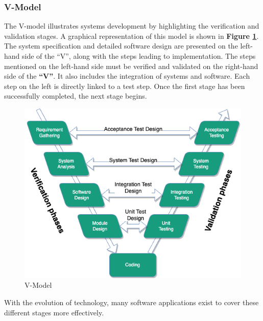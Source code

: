     
\subsubsection{V-Model}
The V-model illustrates systems development by highlighting the verification and validation stages. A graphical representation of this model is shown in \textbf{Figure \ref{fig:v-model}}. The system specification and detailed software design are presented on the left-hand side of the “V”, along with the steps leading to implementation. The steps mentioned on the left-hand side must be verified and validated on the right-hand side of the \textbf{“V”}. It also includes the integration of systems and software. Each step on the left is directly linked to a test step. Once the first stage has been successfully completed, the next stage begins.\\

\begin{figure}[H]
    \centering
    \includegraphics[scale=0.6]{images/V-Model.png}
    \caption{\label{fig:v-model} V-Model \cite{clark2009system} }
\end{figure}

With the evolution of technology, many software applications exist to cover these different stages more effectively. 